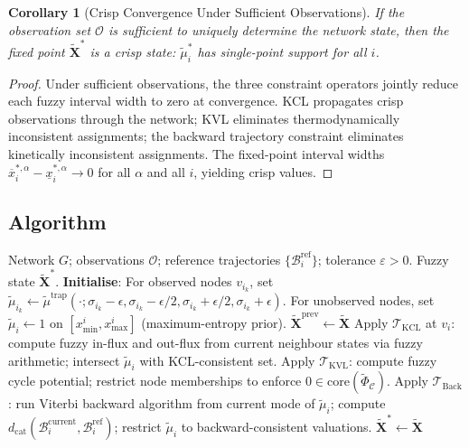 \documentclass[twocolumn,10pt]{article}
\newtheorem{corollary}[theorem]{Corollary}
\theoremstyle{remark}
\newcommand{\fuzzy}[1]{\tilde{#1}}
\newcommand{\fuzzyset}[1]{\tilde{\mu}_{#1}}
\newcommand{\dcat}{d_{\mathrm{cat}}}
\newcommand{\Tkcl}{\mathcal{T}_{\mathrm{KCL}}}
\newcommand{\Tkvl}{\mathcal{T}_{\mathrm{KVL}}}
\newcommand{\Tback}{\mathcal{T}_{\mathrm{Back}}}
\begin{document}
\begin{corollary}[Crisp Convergence Under Sufficient Observations]
\label{cor:crisp}
If the observation set $\mathcal{O}$ is sufficient to uniquely determine the network state, then the fixed point $\fuzzy{\mathbf{X}}^*$ is a crisp state: $\fuzzyset{i}^*$ has single-point support for all $i$.
\end{corollary}

\begin{proof}
Under sufficient observations, the three constraint operators jointly reduce each fuzzy interval width to zero at convergence.  KCL propagates crisp observations through the network; KVL eliminates thermodynamically inconsistent assignments; the backward trajectory constraint eliminates kinetically inconsistent assignments.  The fixed-point interval widths $\overline{x}_i^{*,\alpha} - \underline{x}_i^{*,\alpha} \to 0$ for all $\alpha$ and all $i$, yielding crisp values.
\end{proof}

\subsection{Algorithm}

\begin{algorithm}[H]
\caption{Portfolio Trajectory Completion}
\label{alg:trajectory_completion}
\begin{algorithmic}[1]
\REQUIRE Network $G$; observations $\mathcal{O}$; reference trajectories $\{\mathcal{B}_i^{\text{ref}}\}$; tolerance $\varepsilon > 0$.
\ENSURE Fuzzy state $\fuzzy{\mathbf{X}}^*$.
\STATE \textbf{Initialise}: For observed nodes $v_{i_k}$, set $\fuzzyset{i_k} \leftarrow \tilde{\mu}^{\text{trap}}(\cdot; \sigma_{i_k} - \epsilon, \sigma_{i_k} - \epsilon/2, \sigma_{i_k} + \epsilon/2, \sigma_{i_k} + \epsilon)$.  For unobserved nodes, set $\fuzzyset{i} \leftarrow 1$ on $[x_{\min}^i, x_{\max}^i]$ (maximum-entropy prior).
\REPEAT
    \STATE $\fuzzy{\mathbf{X}}^{\text{prev}} \leftarrow \fuzzy{\mathbf{X}}$
        \STATE Apply $\Tkcl$ at $v_i$: compute fuzzy in-flux and out-flux from current neighbour states via fuzzy arithmetic; intersect $\fuzzyset{i}$ with KCL-consistent set.
    \ENDFOR
        \STATE Apply $\Tkvl$: compute fuzzy cycle potential; restrict node memberships to enforce $0 \in \text{core}(\tilde{\Phi}_\mathcal{C})$.
    \ENDFOR
        \STATE Apply $\Tback$: run Viterbi backward algorithm from current mode of $\fuzzyset{i}$; compute $\dcat(\mathcal{B}_i^{\text{current}}, \mathcal{B}_i^{\text{ref}})$; restrict $\fuzzyset{i}$ to backward-consistent valuations.
    \ENDFOR
\UNTIL{$d(\fuzzy{\mathbf{X}}, \fuzzy{\mathbf{X}}^{\text{prev}}) < \varepsilon$}
\RETURN $\fuzzy{\mathbf{X}}^* \leftarrow \fuzzy{\mathbf{X}}$
\end{algorithmic}
\end{algorithm}
\end{document}
